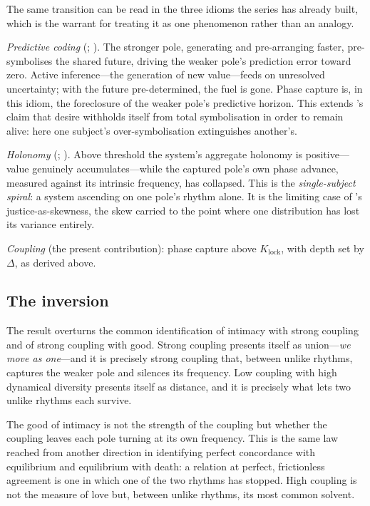 The same transition can be read in the three idioms the series has already built, which is the warrant for treating it as one phenomenon rather than an analogy.

\emph{Predictive coding} (\cite{paperxiii}; \cite{paperxi}). The stronger pole, generating and pre-arranging faster, pre-symbolises the shared future, driving the weaker pole's prediction error toward zero. Active inference---the generation of new value---feeds on unresolved uncertainty; with the future pre-determined, the fuel is gone. Phase capture is, in this idiom, the foreclosure of the weaker pole's predictive horizon. This extends 's claim \parencite{paperxvii} that desire withholds itself from total symbolisation in order to remain alive: here one subject's over-symbolisation extinguishes another's.

\emph{Holonomy} (\cite{paperix}; \cite{paperxi}). Above threshold the system's aggregate holonomy is positive---value genuinely accumulates---while the captured pole's own phase advance, measured against its intrinsic frequency, has collapsed. This is the \emph{single-subject spiral}: a system ascending on one pole's rhythm alone. It is the limiting case of 's justice-as-skewness, the skew carried to the point where one distribution has lost its variance entirely.

\emph{Coupling} (the present contribution): phase capture above $K_{\text{lock}}$, with depth set by $\Delta$, as derived above.

\subsection{The inversion}
\label{p18:sub:crit-inversion}

The result overturns the common identification of intimacy with strong coupling and of strong coupling with good. Strong coupling presents itself as union---\emph{we move as one}---and it is precisely strong coupling that, between unlike rhythms, captures the weaker pole and silences its frequency. Low coupling with high dynamical diversity presents itself as distance, and it is precisely what lets two unlike rhythms each survive.

\begin{claim}
The good of intimacy is not the strength of the coupling but whether the coupling leaves each pole turning at its own frequency. This is the same law  reached from another direction in identifying perfect concordance with equilibrium and equilibrium with death: a relation at perfect, frictionless agreement is one in which one of the two rhythms has stopped. High coupling is not the measure of love but, between unlike rhythms, its most common solvent.
\end{claim}

